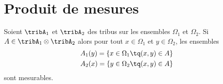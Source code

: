 \section{Produit de mesures}

\begin{lemma} \label{LemAQmWEmN}
	Soient \( \tribA_1\) et \( \tribA_2\) des tribus sur les ensembles \( \Omega_1\) et \( \Omega_2\). Si \( A\in\tribA_1\otimes\tribA_2\) alors pour tout \( x\in \Omega_1\) et \( y\in\Omega_2\), les ensembles
	\begin{subequations}    \label{subEqCTtPccK}
		\begin{align}
			A_1(y)=\{ x\in\Omega_1\tq (x,y)\in A \} \\
			A_2(x)=\{ y\in\Omega_2\tq (x,y)\in A \}
		\end{align}
	\end{subequations}
	sont mesurables.
\end{lemma}

